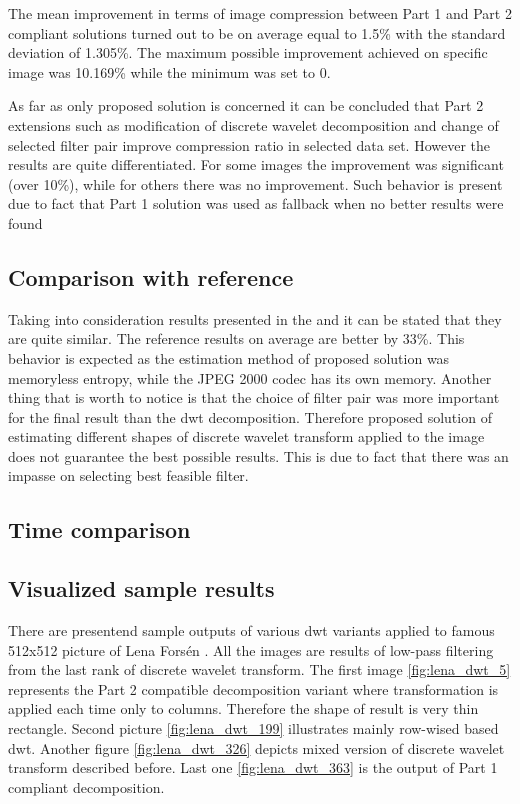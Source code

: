 The mean improvement in terms of image compression between Part 1 and Part 2 compliant solutions
turned out to be on average equal to 1.5\% with the standard deviation of 1.305\%. The maximum
possible improvement achieved on specific image was 10.169\% while the minimum was set to 0.

As far as only proposed solution is concerned it can be concluded that Part 2 extensions such as modification
of discrete wavelet decomposition and change of selected filter pair improve compression ratio
in selected data set. However the results are quite differentiated. For some images the improvement
was significant (over 10\%), while for others there was no improvement. Such behavior is present
due to fact that Part 1 solution was used as fallback when no better results were found


\subsection{Comparison with reference} \label{sec:results_comparison}

Taking into consideration results presented in the  and 
it can be stated that they are quite similar. The reference results on average are better by 33\%.
This behavior is expected as the estimation method of proposed solution was memoryless entropy,
while the JPEG 2000 codec has its own memory. Another thing that is worth to notice is that the
choice of filter pair was more important for the final result than the dwt decomposition.
Therefore proposed solution of estimating different shapes of discrete wavelet transform applied
to the image does not guarantee the best possible results. This is due to fact that there was
an impasse on selecting best feasible filter.

\subsection{Time comparison} \label{sec:time_results}

\subsection{Visualized sample results}

There are presentend sample outputs of various dwt variants applied to famous 512x512 picture
of Lena Forsén \cite{lena}. All the images are results of low-pass filtering from the last
rank of discrete wavelet transform. The first image \ref{fig:lena_dwt_5} represents the Part 2
compatible decomposition variant where transformation is applied each time only to columns.
Therefore the shape of result is very thin rectangle. Second picture \ref{fig:lena_dwt_199}
illustrates mainly row-wised based dwt.
Another figure \ref{fig:lena_dwt_326} depicts mixed version of discrete wavelet transform described
before. Last one \ref{fig:lena_dwt_363} is the output of Part 1 compliant decomposition.

